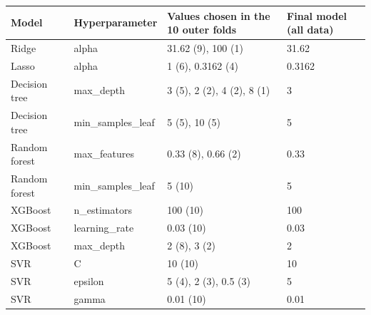 \begin{tabular}{llp{7cm}l}
\toprule
\textbf{Model} & \textbf{Hyperparameter} & \textbf{Values chosen in the 10 outer folds} & \textbf{Final model (all data)} \\
\midrule
Ridge & alpha & 31.62 (9), 100 (1) & 31.62 \\
Lasso & alpha & 1 (6), 0.3162 (4) & 0.3162 \\
Decision tree & max\_depth & 3 (5), 2 (2), 4 (2), 8 (1) & 3 \\
Decision tree & min\_samples\_leaf & 5 (5), 10 (5) & 5 \\
Random forest & max\_features & 0.33 (8), 0.66 (2) & 0.33 \\
Random forest & min\_samples\_leaf & 5 (10) & 5 \\
XGBoost & n\_estimators & 100 (10) & 100 \\
XGBoost & learning\_rate & 0.03 (10) & 0.03 \\
XGBoost & max\_depth & 2 (8), 3 (2) & 2 \\
SVR & C & 10 (10) & 10 \\
SVR & epsilon & 5 (4), 2 (3), 0.5 (3) & 5 \\
SVR & gamma & 0.01 (10) & 0.01 \\
\bottomrule
\end{tabular}
